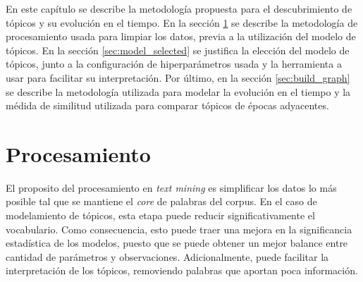 En este capítulo se describe la metodología propuesta para el descubrimiento de tópicos y su evolución en el tiempo. En la sección \ref{sec:processing} se describe la metodología de procesamiento usada para limpiar los datos, previa a la utilización del modelo de tópicos. En la sección \ref{sec:model_selected} se justifica la elección del modelo de tópicos, junto a la configuración de hiperparámetros usada y la herramienta a usar para facilitar su interpretación. Por último, en la sección \ref{sec:build_graph} se describe la metodología utilizada para modelar la evolución en el tiempo y la médida de similitud utilizada para comparar tópicos de épocas adyacentes.

\section{Procesamiento}
\label{sec:processing}

El proposito del procesamiento en \textit{text mining} es simplificar los datos lo más posible tal que se mantiene el \textit{core} de palabras del corpus. En el caso de modelamiento de tópicos, esta etapa puede reducir significativamente el vocabulario. Como consecuencia, esto puede traer una mejora en la significancia estadística de los modelos, puesto que se puede obtener un mejor balance entre cantidad de parámetros y observaciones. Adicionalmente, puede facilitar la interpretación de los tópicos, removiendo palabras que aportan poca información.\\

